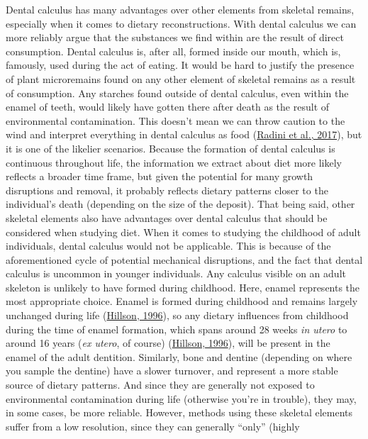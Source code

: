 \documentclass[
  letterpaper,
]{book}
\begin{document}
Dental calculus has many advantages over other elements from skeletal
remains, especially when it comes to dietary reconstructions. With
dental calculus we can more reliably argue that the substances we find
within are the result of direct consumption. Dental calculus is, after
all, formed inside our mouth, which is, famously, used during the act of
eating. It would be hard to justify the presence of plant microremains
found on any other element of skeletal remains as a result of
consumption. Any starches found outside of dental calculus, even within
the enamel of teeth, would likely have gotten there after death as the
result of environmental contamination. This doesn't mean we can throw
caution to the wind and interpret everything in dental calculus as food
(\protect\hyperlink{ref-radiniFoodPathways2017}{Radini et al., 2017}),
but it is one of the likelier scenarios. Because the formation of dental
calculus is continuous throughout life, the information we extract about
diet more likely reflects a broader time frame, but given the potential
for many growth disruptions and removal, it probably reflects dietary
patterns closer to the individual's death (depending on the size of the
deposit). That being said, other skeletal elements also have advantages
over dental calculus that should be considered when studying diet. When
it comes to studying the childhood of adult individuals, dental calculus
would not be applicable. This is because of the aforementioned cycle of
potential mechanical disruptions, and the fact that dental calculus is
uncommon in younger individuals. Any calculus visible on an adult
skeleton is unlikely to have formed during childhood. Here, enamel
represents the most appropriate choice. Enamel is formed during
childhood and remains largely unchanged during life
(\protect\hyperlink{ref-hillsonDentalAnthropology1996}{Hillson, 1996}),
so any dietary influences from childhood during the time of enamel
formation, which spans around 28 weeks \emph{in utero} to around 16
years (\emph{ex utero}, of course)
(\protect\hyperlink{ref-hillsonDentalAnthropology1996}{Hillson, 1996}),
will be present in the enamel of the adult dentition. Similarly, bone
and dentine (depending on where you sample the dentine) have a slower
turnover, and represent a more stable source of dietary patterns. And
since they are generally not exposed to environmental contamination
during life (otherwise you're in trouble), they may, in some cases, be
more reliable. However, methods using these skeletal elements suffer
from a low resolution, since they can generally ``only'' (highly
\end{document}

